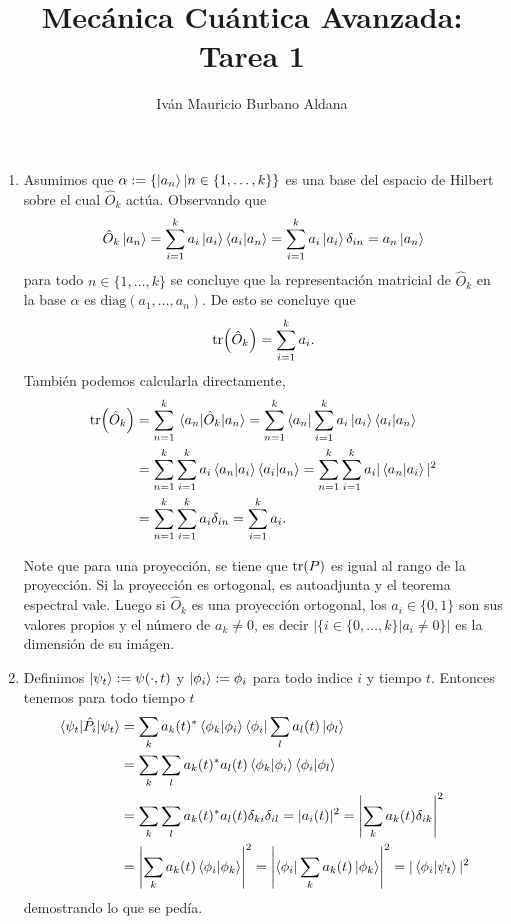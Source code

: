 \documentclass{article}
\author{Iván Mauricio Burbano Aldana}
\title{Mecánica Cuántica Avanzada: Tarea 1}
\begin{document}
\maketitle

\begin{enumerate}

\item Asumimos que $\alpha:=\{\ket{a_n}|n\in\{1,\dots, k\}\}$ es una base del espacio de Hilbert sobre el cual $\hat{O}_k$ actúa. Observando que 
\begin{equation}
\hat{O}_k\ket{a_n}=\sum_{i=1}^k a_i\ket{a_i}\ip{a_i}{a_n}=\sum_{i=1}^ka_i\ket{a_i}\delta_{in}=a_n\ket{a_n}
\end{equation}
para todo $n\in\{1,\dots,k\}$ se concluye que la representación matricial de $\hat{O}_k$ en la base $\alpha$ es $\text{diag}(a_1,\dots,a_n)$. De esto se concluye que
\begin{equation}
\tr(\hat{O}_k)=\sum_{i=1}^ka_i.
\end{equation}
También podemos calcularla directamente,
\begin{align}
\begin{split}
\tr(\hat{O}_k)&=\sum_{n=1}^k\ev{\hat{O}_k}{a_n}=\sum_{n=1}^k\bra{a_n}\sum_{i=1}^k a_i\ket{a_i}\ip{a_i}{a_n} \\
&=\sum_{n=1}^k\sum_{i=1}^ka_i\ip{a_n}{a_i}\ip{a_i}{a_n}=\sum_{n=1}^k\sum_{i=1}^ka_i|\ip{a_n}{a_i}|^2\\
&=\sum_{n=1}^k\sum_{i=1}^ka_i\delta_{in}=\sum_{i=1}^k a_i.
\end{split}
\end{align}

Note que para una proyección, se tiene que $\tr(P)$ es igual al rango de la proyección. Si la proyección es ortogonal, es autoadjunta y el teorema espectral vale. Luego si $\hat{O}_k$ es una proyección ortogonal, los $a_i\in\{0,1\}$ son sus valores propios y el número de $a_k\neq 0$, es decir $|\{i\in\{0,\dots,k\}|a_i\neq 0\}|$ es la dimensión de su imágen.

\item Definimos $\ket{\psi_t}:=\psi(\cdot,t)$ y $\ket{\phi_i}:=\phi_i$ para todo indice $i$ y tiempo $t$. Entonces tenemos para todo tiempo $t$
\begin{align}
\begin{split}
\ev{\hat{P_i}}{\psi_t}&=\sum_k a_k(t)^*\ip{\phi_k}{\phi_i}\bra{\phi_i}\sum_l a_l(t)\ket{\phi_l}\\
&=\sum_k\sum_l a_k(t)^*a_l(t)\ip{\phi_k}{\phi_i}\ip{\phi_i}{\phi_l}\\
&=\sum_k\sum_l a_k(t)^*a_l(t)\delta_{ki}\delta_{il}=|a_i(t)|^2=\left\vert \sum_k a_k(t)\delta_{ik}\right\vert^2\\
&=\left\vert\sum_k a_k(t)\ip{\phi_i}{\phi_k}\right\vert^2=\left\vert \bra{\phi_i}\sum_k a_k(t)\ket{\phi_k}\right\vert^2=|\ip{\phi_i}{\psi_t}|^2
\end{split}
\end{align}
demostrando lo que se pedía.


\end{enumerate}
\end{document}
